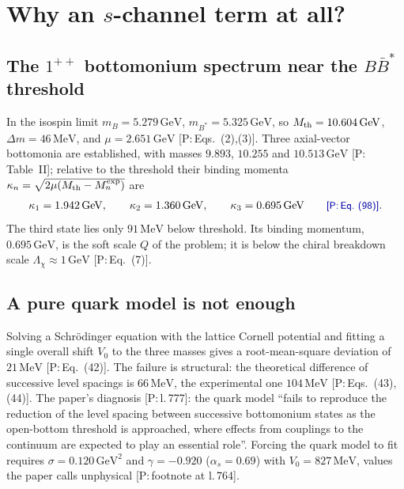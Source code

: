 \documentclass[11pt,a4paper]{article}
\newcommand{\tagP}[1]{\textcolor{blue!65!black}{\textsf{\small[P:\,#1]}}}
\newcommand{\Mth}{M_{\rm th}}
\newcommand{\GeV}{\,\mathrm{GeV}}
\newcommand{\MeV}{\,\mathrm{MeV}}
\begin{document}
\section{Why an $s$-channel term at all?}
\label{sec:why}

\subsection{The $1^{++}$ bottomonium spectrum near the $B\bar B^*$ threshold}

In the isospin limit $m_B=5.279\GeV$, $m_{B^*}=5.325\GeV$, so $\Mth=10.604\GeV$, $\Delta m=46\MeV$, and $\mu=2.651\GeV$ \tagP{Eqs.~(2),(3)}. Three axial-vector bottomonia are established, with masses $9.893$, $10.255$ and $10.513\GeV$ \tagP{Table~II}; relative to the threshold their binding momenta $\kappa_n=\sqrt{2\mu(\Mth-M_n^{\rm exp})}$ are
\begin{equation}
\kappa_1=1.942\GeV,\qquad \kappa_2=1.360\GeV,\qquad \kappa_3=0.695\GeV \qquad\text{\tagP{Eq.~(98)}}.
\end{equation}
The third state lies only $91\MeV$ below threshold. Its binding momentum, $0.695\GeV$, is the soft scale $Q$ of the problem; it is below the chiral breakdown scale $\Lambda_\chi\approx1\GeV$ \tagP{Eq.~(7)}.

\subsection{A pure quark model is not enough}

Solving a Schr\"odinger equation with the lattice Cornell potential and fitting a single overall shift $V_0$ to the three masses gives a root-mean-square deviation of $21\MeV$ \tagP{Eq.~(42)}. The failure is structural: the theoretical difference of successive level spacings is $66\MeV$, the experimental one $104\MeV$ \tagP{Eqs.~(43),(44)}. The paper's diagnosis \tagP{l.\,777}: the quark model ``fails to reproduce the reduction of the level spacing between successive bottomonium states as the open-bottom threshold is approached, where effects from couplings to the continuum are expected to play an essential role''. Forcing the quark model to fit requires $\sigma=0.120\GeV^2$ and $\gamma=-0.920$ ($\alpha_s=0.69$) with $V_0=827\MeV$, values the paper calls unphysical \tagP{footnote at l.\,764}.
\end{document}
